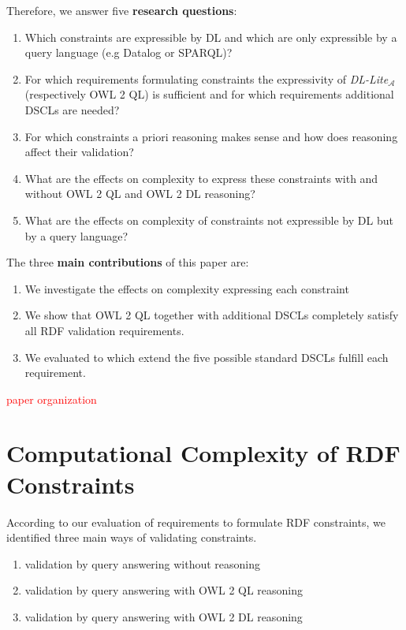 \documentclass{llncs}
\begin{document}
Therefore, we answer five \textbf{research questions}:
\begin{enumerate}
	\item Which constraints are expressible by DL and which are only expressible by a query language (e.g Datalog or SPARQL)?
	\item For which requirements formulating constraints the expressivity of \textit{DL-Lite}$_\mathcal{A}$ (respectively OWL 2 QL) is sufficient
	and for which requirements additional DSCLs are needed?
	\item For which constraints a priori reasoning makes sense and how does reasoning affect their validation?  
	\item What are the effects on complexity to express these constraints with and without OWL 2 QL and OWL 2 DL reasoning?
	\item What are the effects on complexity of constraints not expressible by DL but by a query language?
\end{enumerate}

The three \textbf{main contributions} of this paper are:
\begin{enumerate}
  \item We investigate the effects on complexity expressing each constraint
	\item We show that OWL 2 QL together with additional DSCLs completely satisfy all RDF validation requirements.
	\item We evaluated to which extend the five possible standard DSCLs fulfill each requirement.
\end{enumerate}

\textcolor{red}{paper organization}

\section{Computational Complexity of RDF Constraints}

According to our evaluation of requirements to formulate RDF constraints, we identified three main ways of validating constraints.

\begin{enumerate}
	\item validation by query answering without reasoning
	\item validation by query answering with OWL 2 QL reasoning
	\item validation by query answering with OWL 2 DL reasoning
\end{enumerate}
\end{document}

